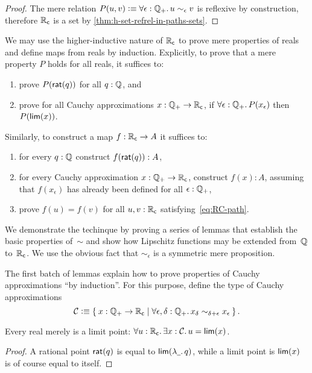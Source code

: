 \begin{proof}
  The mere relation $P(u,v) \defeq \fall{\epsilon : \Qp} u \sim_\epsilon v$ is reflexive by
  construction, therefore $\mathbb{R}_\mathsf{c}$ is a set by \autoref{thm:h-set-refrel-in-paths-sets}.
\end{proof}

We may use the higher-inductive nature of $\mathbb{R}_\mathsf{c}$ to prove mere properties of reals and
define maps from reals by induction. Explicitly, to prove that a mere property $P$ holds
for all reals, it suffices to:
%
\begin{enumerate}
\item prove $P(\mathsf{rat}(q))$ for all $q : \mathbb{Q}$, and
\item prove for all Cauchy approximations $x : \mathbb{Q}_{+} \to \mathbb{R}_\mathsf{c}$, if $\fall{\epsilon : \Qp}
  P(x_\epsilon)$ then $P(\mathsf{lim}(x))$.
\end{enumerate}
%
Similarly, to construct a map $f : \mathbb{R}_\mathsf{c} \to A$ it suffices to:
%
\begin{enumerate}
\item for every $q : \mathbb{Q}$ construct $f(\mathsf{rat}(q)) : A$,
\item for every Cauchy approximation $x : \mathbb{Q}_{+} \to \mathbb{R}_\mathsf{c}$, construct $f(x) : A$,
  assuming that $f(x_\epsilon)$ has already been defined for all $\epsilon : \mathbb{Q}_{+}$,
\item prove $f(u) = f(v)$ for all $u, v : \mathbb{R}_\mathsf{c}$ satisfying~\eqref{eq:RC-path}.
\end{enumerate}
%
We demonstrate the techinque by proving a series of lemmas that establish the basic
properties of~$\sim$ and show how Lipschitz functions may be extended from~$\mathbb{Q}$ to~$\mathbb{R}_\mathsf{c}$. 
We use the obvious fact that $\sim_\epsilon$ is a symmetric mere proposition.

The first batch of lemmas explain how to prove properties of Cauchy approximations ``by
induction''. For this purpose, define the type of Cauchy approximations
% 
\begin{equation*}
  \CAP \defeq
  \setof{ x : \Qp \to \RC |
    \fall{\epsilon, \delta : \Qp} x_\delta \sim_{\delta + \epsilon} x_\epsilon
  }.
\end{equation*}

\begin{lem} \label{RC-lim-onto}
  Every real merely is a limit point: $\fall{u : \RC} \exis{x : \CAP} u = \rclim(x)$.
\end{lem}

\begin{proof}
  A rational point $\mathsf{rat}(q)$ is equal to $\rclim(\lam{\blank} q)$, while a limit
  point is $\mathsf{lim}(x)$ is of course equal to itself.
\end{proof}

